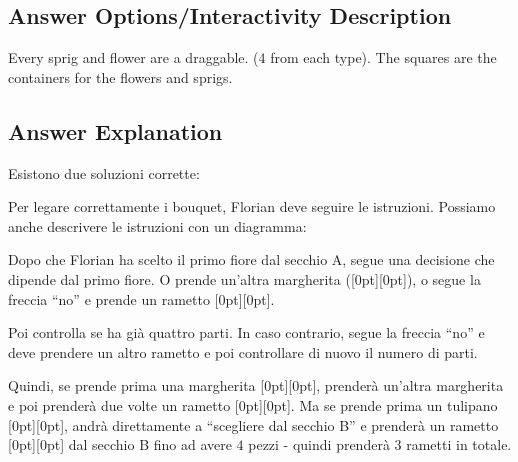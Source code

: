 \documentclass[a4paper,11pt]{report}
\newcommand{\taskGraphicsFolder}{..}
\begin{document}
\begingroup
\renewcommand{\arraystretch}{1.5}
\subsection*{Answer Options/Interactivity Description}

Every sprig and flower are a draggable. ($4$ from each type). The squares are the containers for the flowers and sprigs.

\endgroup

\subsection*{Answer Explanation}

Esistono due soluzioni corrette:

{\centering%
\raisebox{-0.5ex}{}
\raisebox{-0.5ex}{}\par}

Per legare correttamente i bouquet, Florian deve seguire le istruzioni. Possiamo anche descrivere le istruzioni con un diagramma:

{\centering%
\par}

Dopo che Florian ha scelto il primo fiore dal secchio A, segue una decisione che dipende dal primo fiore. O prende un’altra margherita (\raisebox{\dimexpr -0.5ex -1.0ex \relax}[0pt][0pt]{}), o segue la freccia \enquote{no} e prende un rametto \raisebox{\dimexpr -0.5ex -0.5ex \relax}[0pt][0pt]{}.

Poi controlla se ha già quattro parti.
In caso contrario, segue la freccia \enquote{no} e deve prendere un altro rametto e poi controllare di nuovo il numero di parti.

Quindi, se prende prima una margherita \raisebox{\dimexpr -0.5ex -1.0ex \relax}[0pt][0pt]{}, prenderà un’altra margherita e poi prenderà due volte un rametto \raisebox{\dimexpr -0.5ex -0.5ex \relax}[0pt][0pt]{}. Ma se prende prima un tulipano \raisebox{-0.5ex}[0pt][0pt]{}, andrà direttamente a \enquote{scegliere dal secchio B} e prenderà un rametto \raisebox{\dimexpr -0.5ex -0.5ex \relax}[0pt][0pt]{} dal secchio B fino ad avere $4$ pezzi - quindi prenderà $3$ rametti in totale.
\end{document}
